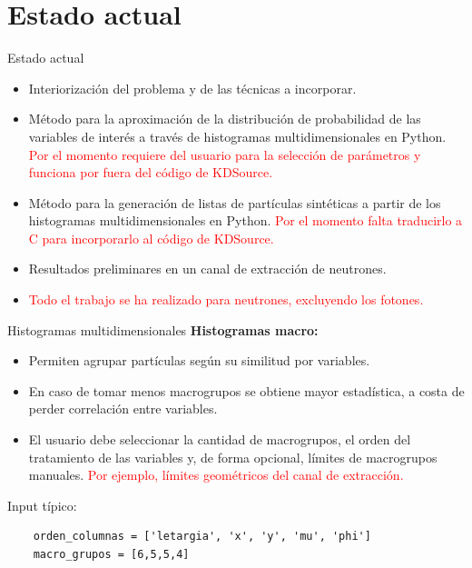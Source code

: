 \documentclass[aspectratio=169,english]{beamer}
\begin{document}
\section{Estado actual}
\begin{frame}{Estado actual}
    \begin{itemize}
        \item Interiorización del problema y de las técnicas a incorporar.
        \item Método para la aproximación de la distribución de probabilidad de las variables de interés a través de histogramas multidimensionales en Python. \textcolor{red}{Por el momento requiere del usuario para la selección de parámetros y funciona por fuera del código de KDSource.}
        \item Método para la generación de listas de partículas sintéticas a partir de los histogramas multidimensionales en Python. \textcolor{red}{Por el momento falta traducirlo a C para incorporarlo al código de KDSource.}
        \item Resultados preliminares en un canal de extracción de neutrones.
        \item \textcolor{red}{Todo el trabajo se ha realizado para neutrones, excluyendo los fotones.}
    \end{itemize}

\end{frame}

\begin{frame}[fragile]{Histogramas multidimensionales}
    \textbf{Histogramas macro:}
    \begin{itemize}
        \item Permiten agrupar partículas según su similitud por variables.
        \item En caso de tomar menos macrogrupos se obtiene mayor estadística, a costa de perder correlación entre variables.
        \item El usuario debe seleccionar la cantidad de macrogrupos, el orden del tratamiento de las variables y, de forma opcional, límites de macrogrupos manuales. \textcolor{red}{Por ejemplo, límites geométricos del canal de extracción.}
    \end{itemize} 

    Input típico:

    \begin{verbatim}
    orden_columnas = ['letargia', 'x', 'y', 'mu', 'phi']
    macro_grupos = [6,5,5,4]
    \end{verbatim}

\end{frame}
\end{document}
